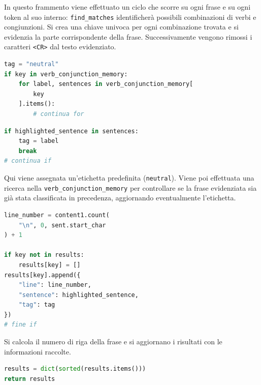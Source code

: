 \documentclass[12pt]{report}
\begin{document}
\noindent In questo frammento viene effettuato un ciclo che scorre su ogni frase e su ogni token al suo interno: \texttt{find\_matches} identificherà possibili combinazioni di verbi e congiunzioni. Si crea una chiave univoca per ogni combinazione trovata e si evidenzia la parte corrispondente della frase. Successivamente vengono rimossi i caratteri \texttt{<CR>} dal testo evidenziato.


\begin{mdframed}
\small
\begin{lstlisting}[language=Python]
tag = "neutral"
if key in verb_conjunction_memory:
    for label, sentences in verb_conjunction_memory[
        key
    ].items():
        # continua for
\end{lstlisting}
\end{mdframed}

\begin{mdframed}
\small
\begin{lstlisting}[language=Python]
if highlighted_sentence in sentences:
    tag = label
    break
# continua if
\end{lstlisting}
\end{mdframed}

\noindent Qui viene assegnata un'etichetta predefinita (\texttt{neutral}). Viene poi effettuata una ricerca nella \texttt{verb\_conjunction\_memory} per controllare se la frase evidenziata sia già stata classificata in precedenza, aggiornando eventualmente l'etichetta.


\begin{mdframed}
\small
\begin{lstlisting}[language=Python]
line_number = content1.count(
    "\n", 0, sent.start_char
) + 1

if key not in results:
    results[key] = []
results[key].append({
    "line": line_number,
    "sentence": highlighted_sentence,
    "tag": tag
})
# fine if
\end{lstlisting}
\end{mdframed}

\noindent Si calcola il numero di riga della frase e si aggiornano i risultati con le informazioni raccolte.


\begin{mdframed}
\small
\begin{lstlisting}[language=Python]
results = dict(sorted(results.items()))
return results
\end{lstlisting}
\end{mdframed}
\end{document}
